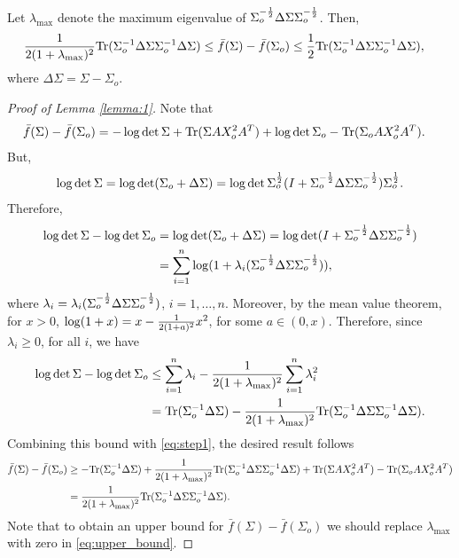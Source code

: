 \documentclass[onecolumn]{IEEEtran}
\begin{document}
\begin{lemma}\label{lemma:1}
Let $\lambda_{\max}$ denote the maximum eigenvalue of $\Sigma_o^{-{1\over 2}}\Delta \Sigma\Sigma_o^{-{1\over 2}}$. Then,
\begin{align}
{1\over 2(1+\lambda_{\max})^2}{\rm Tr}(\Sigma_o^{-1}\Delta \Sigma\Sigma_o^{-1}\Delta \Sigma)\leq  \bar{f}(\Sigma)-\bar{f}(\Sigma_o)&\leq {1\over 2}{\rm Tr}(\Sigma_o^{-1}\Delta \Sigma\Sigma_o^{-1}\Delta \Sigma),
\end{align}
where  $\Delta \Sigma=\Sigma-\Sigma_o$. 
\end{lemma}


\begin{proof}[Proof of Lemma \ref{lemma:1}]
Note that 
\begin{align}
\bar{f}(\Sigma)-\bar{f}(\Sigma_o)&=-\log\det \Sigma +{\rm Tr}(\Sigma AX_o^2A^T) +\log\det \Sigma_o -{\rm Tr}(\Sigma_o AX_o^2A^T).\label{eq:step1}
\end{align}
But,
\begin{align}
\log\det \Sigma =\log\det(\Sigma_o+\Delta \Sigma)=\log\det \Sigma_o^{1\over 2}(I+\Sigma_o^{-{1\over 2}}\Delta \Sigma\Sigma_o^{-{1\over 2}})\Sigma_o^{1\over 2}.
\end{align}
Therefore,
\begin{align}
\log\det \Sigma-\log\det \Sigma_o &=\log\det(\Sigma_o+\Delta \Sigma)=\log\det (I+\Sigma_o^{-{1\over 2}}\Delta \Sigma\Sigma_o^{-{1\over 2}})\nonumber\\
&=\sum_{i=1}^n\log(1+\lambda_i(\Sigma_o^{-{1\over 2}}\Delta \Sigma\Sigma_o^{-{1\over 2}})),
\end{align}
where $\lambda_i=\lambda_i(\Sigma_o^{-{1\over 2}}\Delta \Sigma\Sigma_o^{-{1\over 2}})$, $i=1,\ldots,n$.  Moreover, by the mean value theorem, for $x>0$, $\log(1+x)= x-{1\over 2(1+a)^2}x^2$, for some $a\in(0,x)$.  Therefore, since $\lambda_i\geq 0$, for all $i$, we have  
\begin{align}
\log\det \Sigma-\log\det \Sigma_o &\leq \sum_{i=1}^n\lambda_i -{1\over 2(1+\lambda_{\max})^2} \sum_{i=1}^n \lambda_i^2\nonumber\\
&= {\rm Tr}(\Sigma_o^{-1}\Delta \Sigma)-{1\over 2(1+\lambda_{\max})^2}{\rm Tr}(\Sigma_o^{-1}\Delta \Sigma\Sigma_o^{-1}\Delta \Sigma).
\end{align}
Combining this bound with \eqref{eq:step1}, the desired result follows
\begin{align}\label{eq:upper_bound}
\bar{f}(\Sigma)-\bar{f}(\Sigma_o)&\geq  -{\rm Tr}(\Sigma_o^{-1}\Delta \Sigma)+{1\over 2(1+\lambda_{\max})^2}{\rm Tr}(\Sigma_o^{-1}\Delta \Sigma\Sigma_o^{-1}\Delta \Sigma) +{\rm Tr}(\Sigma AX_o^2A^T)  -{\rm Tr}(\Sigma_o AX_o^2A^T)\nonumber\\
&={1\over 2(1+\lambda_{\max})^2}{\rm Tr}(\Sigma_o^{-1}\Delta \Sigma\Sigma_o^{-1}\Delta \Sigma).
\end{align}
Note that to obtain an upper bound for $\bar{f}(\Sigma)-\bar{f}(\Sigma_o)$ we should replace $\lambda_{\max}$ with zero in \eqref{eq:upper_bound}.

\end{proof}
\end{document}
